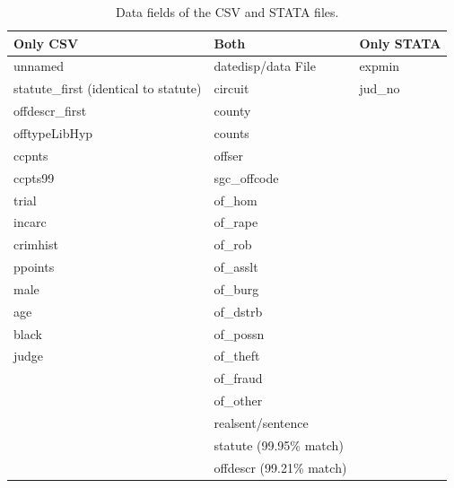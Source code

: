 \documentclass[11pt, oneside]{article}   	%
\newcommand{\rowgroup}[1]{\hspace{-1em}#1}
\theoremstyle{ModifiedStyle}
\begin{document}
  	\begin{table}[H]
  		\centering
  		\vspace{2mm}
  		\caption{Data fields of the CSV and STATA files.}
  		\vspace{-2mm}
  		\setlength\tabcolsep{0pt} %
  		{\footnotesize
  			\begin{tabular}{C{50mm}C{50mm}C{50mm}}
  				\toprule
  				Only CSV & Both & Only STATA \\
  				\midrule
  				unnamed & datedisp/data File & expmin \\
  				statute\_first (identical to statute) & circuit & jud\_no \\
  				offdescr\_first & county &  \\
  				offtypeLibHyp & counts &  \\
  				ccpnts & offser &  \\
  				ccpts99 & sgc\_offcode &  \\
  				trial & of\_hom &  \\
  				incarc & of\_rape &  \\
  				crimhist & of\_rob &  \\
  				ppoints & of\_asslt &  \\
  				male & of\_burg &  \\
  				age & of\_dstrb &  \\
  				black & of\_possn &  \\
  				judge & of\_theft &  \\
  				& of\_fraud &  \\
  				& of\_other &  \\
  				& realsent/sentence &  \\
  				& statute (99.95\% match) &  \\
  				& offdescr (99.21\% match) &  \\
  				\bottomrule
  			\end{tabular}
  		}
  		\label{Table_Sentencing_Data_Fields}
  	\end{table}
\end{document}
